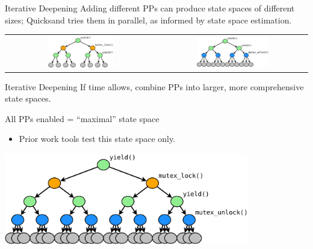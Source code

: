 \documentclass[xcolor=dvipsnames]{beamer}
\begin{document}
\begin{frame}{Iterative Deepening}
	Adding different PPs can produce state spaces of different sizes; Quicksand tries them in parallel, as informed by state space estimation.
	\vspace{0.15in}
	\begin{center}
		\begin{tabular}{cc}
			\includegraphics[width=0.45\textwidth]{tree1.pdf} &
			\includegraphics[width=0.5\textwidth]{tree2.pdf}
		\end{tabular}
	\end{center}
\end{frame}


\begin{frame}{Iterative Deepening}
	If time allows, combine PPs into larger, more comprehensive state spaces.
	\linegap

	All PPs enabled = ``maximal'' state space
	\begin{itemize}
		\item Prior work tools test this state space only.
	\end{itemize}
	\begin{center}
		\includegraphics[width=0.8\textwidth]{tree3.pdf}
	\end{center}
\end{frame}
\end{document}
